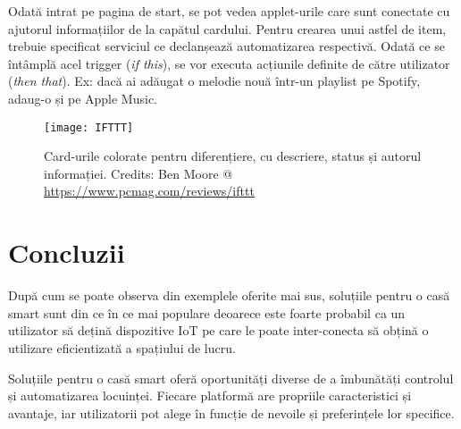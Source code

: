 Odată intrat pe pagina de start, se pot vedea applet-urile care sunt conectate cu ajutorul informațiilor de la capătul cardului. Pentru crearea unui astfel de item, trebuie specificat serviciul ce declanșează automatizarea respectivă. Odată ce se întâmplă acel trigger (\emph{if this}), se vor executa acțiunile definite de către utilizator (\emph{then that}). Ex: dacă ai adăugat o melodie nouă într-un playlist pe Spotify, adaug-o și pe Apple Music.


\begin{figure}[h]
	\centering
	\texttt{[image: IFTTT]}
	\caption{Card-urile colorate pentru diferențiere, cu descriere, status și autorul informației.
		Credits: Ben Moore @ \url{https://www.pcmag.com/reviews/ifttt}}
	\label{fig:ifttt}
\end{figure}

\break

\section{Concluzii}

După cum se poate observa din exemplele oferite mai sus, soluțiile pentru o casă smart sunt din ce în ce mai populare deoarece este foarte probabil ca un utilizator să dețină dispozitive IoT pe care le poate inter-conecta să obțină o utilizare eficientizată a spațiului de lucru.

Soluțiile pentru o casă smart oferă oportunități diverse de a îmbunătăți controlul și automatizarea locuinței. Fiecare platformă are propriile caracteristici și avantaje, iar utilizatorii pot alege în funcție de nevoile și preferințele lor specifice.